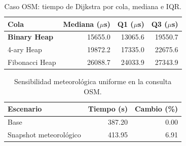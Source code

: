 \begin{table}[H]
\centering
\caption{Caso OSM: tiempo de Dijkstra por cola, mediana e IQR.}
\label{tab:benchmark_osm}
\begin{tabular}{lrrr}
\toprule
Cola & Mediana ($\mu$s) & Q1 ($\mu$s) & Q3 ($\mu$s) \\
\midrule
\textbf{Binary Heap} & 15655.0 & 13065.6 & 19550.7 \\
4-ary Heap & 19872.2 & 17335.0 & 22675.6 \\
Fibonacci Heap & 26088.7 & 24033.9 & 27343.9 \\
\bottomrule
\end{tabular}
\end{table}

\begin{table}[H]
\centering
\caption{Sensibilidad meteorológica uniforme en la consulta OSM.}
\label{tab:sensibilidad_clima}
\begin{tabular}{lrr}
\toprule
Escenario & Tiempo (s) & Cambio (\%) \\
\midrule
Base & 387.20 & 0.00 \\
Snapshot meteorológico & 413.95 & 6.91 \\
\bottomrule
\end{tabular}
\end{table}
